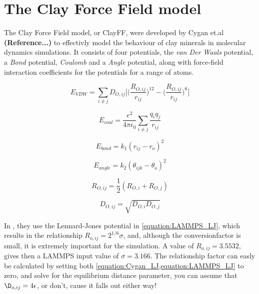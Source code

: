 \documentclass[twoside,english]{uiofysmaster}
\begin{document}
\section{The Clay Force Field model}

The Clay Force Field model, or ClayFF, were developed by Cygan et.al \textbf{(Reference...)} to effectivly model the behaviour of clay minerals in molecular dynamics simulations. It consists of four potentials, the \textit{van Der Waals} potential, a \textit{Bond} potential, \textit{Coulomb} and a \textit{Angle} potential, along with force-field interaction coefficients for the potentials for a range of atoms.

\begin{equation}
E_{VDW} = \sum _{i\neq j} D_{O,ij}\Big[ \Big( \frac{R_{O,ij}}{r_{ij}} \Big) ^{12} - \Big( \frac{R_{O,ij}}{r_{ij}} \Big) ^{6} \Big]
\label{equation:Cygan_LJ}
\end{equation}

\begin{equation}
E_{coul} = \frac{e^2}{4\pi \epsilon _0}\sum _{i\neq j} \frac{q_i q_j}{r_{ij}}
\label{equation:Cygan_coul}
\end{equation}

\begin{equation}
E_{bond} = k_1(r_{ij}-r_o)^2
\label{equation:Cygan_bond}
\end{equation}

\begin{equation}
E_{angle} = k_2(\theta _{ijk} - \theta _o)^2
\label{equation:Cygan_angle}
\end{equation}

\begin{equation}
R_{O,ij} = \frac{1}{2}(R_{O,i} + R_{O,j})
\label{equation:arithmetic_avg}
\end{equation}

\begin{equation}
D_{O,ij} = \sqrt{D_{O,i}D_{O,j}}
\label{equation:geometric_avg}
\end{equation}

In \lammps, they use the Lennard-Jones potential in \ref{equation:LAMMPS_LJ}, which results in the relationship $ R_{o,ij} = 2^{1/6}\sigma $, and, although the conversionfactor is small, it is extremely important for the simulation. A value of $ R_{o,ij} = 3.5532 $, gives then a LAMMPS input value of $ \sigma = 3.166 $. The relationship factor can easly be calculated by setting both \ref{equation:Cygan_LJ,equation:LAMMPS_LJ} to zero, and solve for the equilibrium distance parameter, you can assume that $ \D_{o,ij} = 4\epsilon $, or don't, cause it falls out either way!
\end{document}
